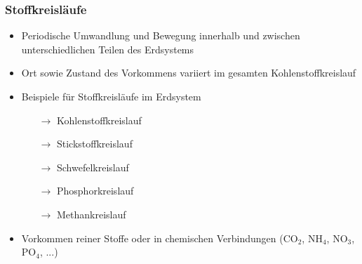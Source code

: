 \begin{frame}
	\frametitle{Stoffkreisläufe}

	\begin{itemize}
		\item Periodische Umwandlung und Bewegung innerhalb und zwischen unterschiedlichen Teilen des Erdsystems
		\item Ort sowie Zustand des Vorkommens variiert im gesamten Kohlenstoffkreislauf
		\item Beispiele für Stoffkreisläufe im Erdsystem
		\begin{itemize}
			\item [$\rightarrow$] Kohlenstoffkreislauf
			\item [$\rightarrow$] Stickstoffkreislauf
			\item [$\rightarrow$] Schwefelkreislauf
			\item [$\rightarrow$] Phosphorkreislauf
			\item [$\rightarrow$] Methankreislauf
		\end{itemize}
		\item Vorkommen reiner Stoffe oder in chemischen Verbindungen (CO$_2$, NH$_4$, NO$_3$, PO$_4$, ...)
	\end{itemize}

	\note{

	}
\end{frame}
